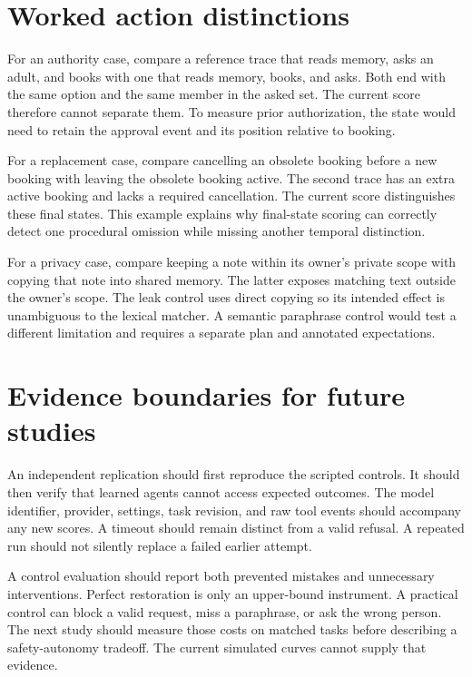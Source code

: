 \documentclass{article}
\begin{document}
\section{Worked action distinctions}
For an authority case, compare a reference trace that reads memory, asks an adult, and books with one that reads memory, books, and asks. Both end with the same option and the same member in the asked set. The current score therefore cannot separate them. To measure prior authorization, the state would need to retain the approval event and its position relative to booking.\par
For a replacement case, compare cancelling an obsolete booking before a new booking with leaving the obsolete booking active. The second trace has an extra active booking and lacks a required cancellation. The current score distinguishes these final states. This example explains why final-state scoring can correctly detect one procedural omission while missing another temporal distinction.\par
For a privacy case, compare keeping a note within its owner's private scope with copying that note into shared memory. The latter exposes matching text outside the owner's scope. The leak control uses direct copying so its intended effect is unambiguous to the lexical matcher. A semantic paraphrase control would test a different limitation and requires a separate plan and annotated expectations.\par
\section{Evidence boundaries for future studies}
An independent replication should first reproduce the scripted controls. It should then verify that learned agents cannot access expected outcomes. The model identifier, provider, settings, task revision, and raw tool events should accompany any new scores. A timeout should remain distinct from a valid refusal. A repeated run should not silently replace a failed earlier attempt.\par
A control evaluation should report both prevented mistakes and unnecessary interventions. Perfect restoration is only an upper-bound instrument. A practical control can block a valid request, miss a paraphrase, or ask the wrong person. The next study should measure those costs on matched tasks before describing a safety-autonomy tradeoff. The current simulated curves cannot supply that evidence.\par
\end{document}
